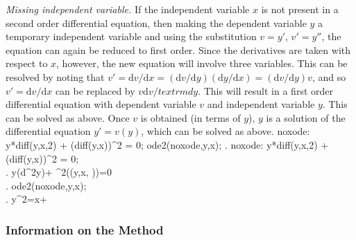 \noindent
\textit{Missing independent variable.}\quad
If the independent variable $x$ is not present in a second order
differential equation, then making the dependent variable $y$ a
temporary independent variable and using the substitution $v=y'$,
$v'=y''$, the equation can again be reduced to first order.
Since the derivatives are taken with respect to $x$, however, 
the new equation will involve three variables.  This can be resolved
by noting that $v'=\textrm{d}v/\textrm{d}x =
(\textrm{d}v/\textrm{d}y)(\textrm{d}y/\textrm{d}x)  
= (\textrm{d}v/\textrm{d}y) v$, and so $v'= \textrm{d}v/\textrm{d}x$
can be replaced by $v\textrm{d}v/textrm{d}y$.  This will result in a
first order differential equation with dependent variable $v$ and
independent variable $y$.  This can be solved as above.
Once $v$ is obtained (in terms of $y$), $y$ is a solution of the
differential equation $y'=v(y)$, which can be solved as above.
\beginmaximasession
noxode: y*diff(y,x,2) + (diff(y,x))^2 = 0;
ode2(noxode,y,x);
\maximatexsession
{}.  noxode: y*diff(y,x,2) + (diff(y,x))^2 = 0; \\
.   y\*\left({{d^{2}}}\*y\right)+
 ^{2}\left(\left(y,\linebreak[0]x,
 \right)\right)=0 \\
.  ode2(noxode,y,x); \\
.   {{y^{2}}}=x+ \\
\endmaximasession

\subsubsection{Information on the Method}

